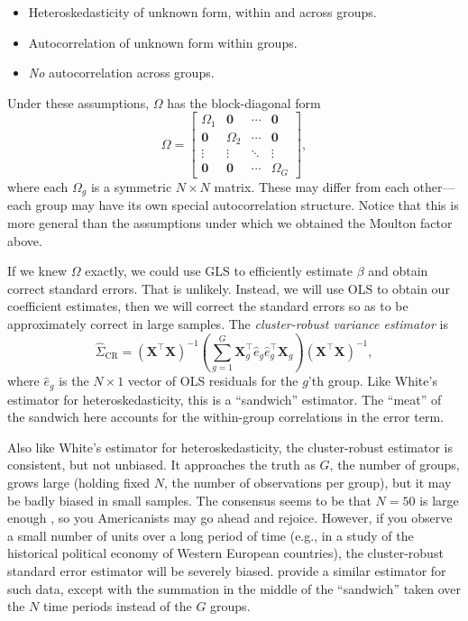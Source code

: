 \documentclass[12pt,oneside,openany]{book}
\begin{document}
\begin{itemize}
\item
  Heteroskedasticity of unknown form, within and across groups.
\item
  Autocorrelation of unknown form within groups.
\item
  \emph{No} autocorrelation across groups.
\end{itemize}

Under these assumptions, \(\Omega\) has the block-diagonal form \[
\Omega = \begin{bmatrix}
  \Omega_1 & \mathbf{0} & \cdots & \mathbf{0} \\
  \mathbf{0} & \Omega_2 & \cdots & \mathbf{0} \\
  \vdots & \vdots & \ddots & \vdots \\
  \mathbf{0} & \mathbf{0} & \cdots & \Omega_G
\end{bmatrix},
\] where each \(\Omega_g\) is a symmetric \(N \times N\) matrix. These
may differ from each other---each group may have its own special
autocorrelation structure. Notice that this is more general than the
assumptions under which we obtained the Moulton factor above.

If we knew \(\Omega\) exactly, we could use GLS to efficiently estimate
\(\beta\) and obtain correct standard errors. That is unlikely. Instead,
we will use OLS to obtain our coefficient estimates, then we will
correct the standard errors so as to be approximately correct in large
samples. The \emph{cluster-robust variance estimator} is \[
\hat{\Sigma}_{\text{CR}} =
(\mathbf{X}^\top \mathbf{X})^{-1}
\left( \sum_{g=1}^G \mathbf{X}_g^\top \hat{e}_g \hat{e}_g^\top \mathbf{X}_g \right)
(\mathbf{X}^\top \mathbf{X})^{-1},
\] where \(\hat{e}_g\) is the \(N \times 1\) vector of OLS residuals for
the \(g\)'th group. Like White's estimator for heteroskedasticity, this
is a ``sandwich'' estimator. The ``meat'' of the sandwich here accounts
for the within-group correlations in the error term.

Also like White's estimator for heteroskedasticity, the cluster-robust
estimator is consistent, but not unbiased. It approaches the truth as
\(G\), the number of groups, grows large (holding fixed \(N\), the
number of observations per group), but it may be badly biased in small
samples. The consensus seems to be that \(N = 50\) is large enough
\citep{Cameron:2015ud}, so you Americanists may go ahead and rejoice.
However, if you observe a small number of units over a long period of
time (e.g., in a study of the historical political economy of Western
European countries), the cluster-robust standard error estimator will be
severely biased. \citet{Beck:1995hm} provide a similar estimator for
such data, except with the summation in the middle of the ``sandwich''
taken over the \(N\) time periods instead of the \(G\) groups.
\end{document}
